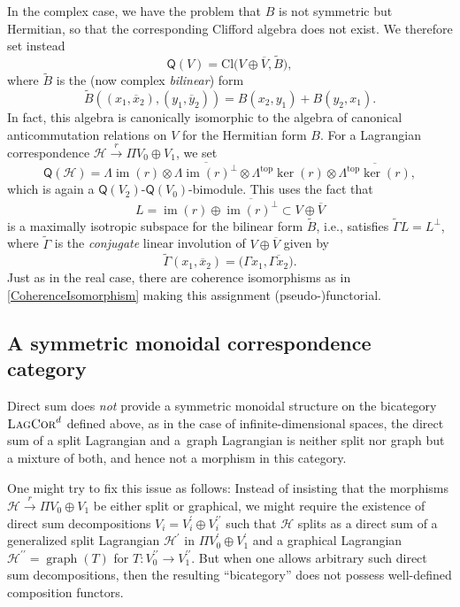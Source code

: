 \documentclass[pdftex]{sigma}
\numberwithin{equation}{section}
\DeclareMathOperator{\im}{\mathrm{im}}
\DeclareMathOperator{\graph}{\mathrm{graph}}
\newcommand{\LagCor}{\textsc{LagCor}}
\newcommand{\Cl}{\mathrm{Cl}}
\begin{document}
In the complex case, we have the problem that $B$ is not symmetric but Hermitian, so that the corresponding Clifford algebra does not exist.
We therefore set instead
\begin{equation*}
 \mathsf{Q}(V) = \Cl\big(V \oplus \overline{V}, \tilde{B}\big),
\end{equation*}
where $\tilde{B}$ is the (now complex \emph{bilinear}) form
\begin{equation*}
 \tilde{B}((x_1, \overline{x}_2), (y_1, \overline{y}_2)) = B(x_2, y_1) + B(y_2, x_1).
\end{equation*}
In fact, this algebra is canonically isomorphic to the algebra of canonical anticommutation relations on $V$ for the Hermitian form $B$.
For a Lagrangian correspondence $\mathcal{H} \stackrel{r}{\to} \Pi V_0 \oplus V_1$, we set
\begin{equation*}
 \textsf{Q}(\mathcal{H}) = \Lambda \im(r) \otimes \overline{\Lambda \im(r)^\perp} \otimes \Lambda^{\mathrm{top}} \ker(r)\otimes \overline{\Lambda^{\mathrm{top}} \ker(r)},
\end{equation*}
which is again a $\textsf{Q}(V_2)$-$\textsf{Q}(V_0)$-bimodule.
This uses the fact that
\begin{equation*}
L = \im(r) \oplus \overline{\im(r)^\perp} \subset V \oplus \overline{V}
\end{equation*}
is a maximally isotropic subspace for the bilinear form $\tilde{B}$, i.e., satisfies $\tilde{\Gamma} L = L^\perp$, where $\tilde{\Gamma}$ is the \emph{conjugate} linear involution of $V \oplus \overline{V}$ given by \[\tilde{\Gamma}(x_1, \overline{x}_2) = \big(\Gamma x_1, \overline{\Gamma x_2}\big).\]
Just as in the real case, there are coherence isomorphisms as in \eqref{CoherenceIsomorphism} making this assignment (pseudo-)functorial.


\subsection{A symmetric monoidal correspondence category}
\label{SectionSymmetricMonoidalVersion}

Direct sum does \emph{not} provide a symmetric monoidal structure on the bicategory $\LagCor^d$ defined above, as in the case of infinite-dimensional spaces, the direct sum of a split Lagrangian and a~graph Lagrangian is neither split nor graph but a mixture of both, and hence not a morphism in this category.

One might try to fix this issue as follows:
Instead of insisting that the morphisms $\mathcal{H} \stackrel{r}{\to} \Pi V_0 \oplus V_1$ be either split or graphical, we might require the existence of direct sum decompositions $V_i = V_i^\prime \oplus V_i^{\prime\prime}$ such that $\mathcal{H}$ splits as a direct sum of a generalized split Lagrangian $\mathcal{H}^\prime$ in $\Pi V_0^\prime \oplus V_1^\prime$ and a graphical Lagrangian $\mathcal{H}^{\prime\prime} = \graph(T)$ for $T\colon V_0^{\prime\prime} \to V_1^{\prime\prime}$.
But when one allows arbitrary such direct sum decompositions, then the resulting ``bicategory'' does not possess well-defined composition functors.
\end{document}
